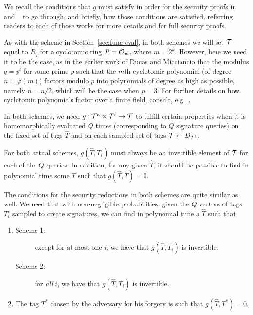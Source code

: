 We recall the conditions that $g$ must satisfy in order for the
security proofs in~\cite{DBLP:conf/pkc/Alperin-Sheriff15} and
~\cite{DBLP:conf/eurocrypt/MicciancioP12} to go through, and briefly,
how those conditions are satisfied, referring readers to each of those
works for more details and for full security proofs.

As with the scheme in Section~\ref{sec:func-eval}, in both schemes we will set $\mathcal{T}$
equal to $R_q$ for a cyclotomic ring $R = \mathcal{O}_{m}$, where
$m=2^{k}$. However, here we need it to be the case, as in the earlier
work of Ducas and Micciancio  that the modulus $q=p^t$ for some prime $p$ such that the
$m$th cyclotomic polynomial (of degree $n=\varphi(m)$) factors modulo $p$ into
polynomials of degree as high as possible, namely $\bar{n}=n/2$, which will be
the case when $p=3$. For further details
on how cyclotomic polynomials factor over a finite field,
consult, e.g.~\cite[Theorem 2.47]{FiniteFieldsIntro}.


In both schemes, we need $g: \mathcal{T}^{\kappa} \times \mathcal{T}^{\ell} \to
\mathcal{T}$ to fulfill certain properties when it is homomorphically evaluated $Q$ times (corresponding to
$Q$ signature queries) on the fixed set of tags $\hat{T}$ and on each
sampled set of tags $\mathcal{T} \gets D_{T^{\ell}}$.

For both actual schemes, $g(\hat{T},T_i)$ must always be an invertible
element of $\mathcal{T}$ for each of the $Q$ queries.
In addition, for any given $\hat{T}$, it should be possible to find in
polynomial time some $\bar{T}$ such that $g(\hat{T},\bar{T})=0$. 

The conditions for the security reductions in both schemes are quite
similar as well. We need that with non-negligible
probabilities, given the $Q$ vectors of tags $T_i$ sampled
to create signatures, we can find in
  polynomial time a $\hat{T}$ such that
\begin{enumerate}
\item \begin{description}
\item[Scheme 1:] except for at most one $i$, we have that
  $g(\hat{T}, T_i)$ is invertible. 
\item[Scheme 2:] for \emph{all} $i$, we have that $g(\hat{T}, T_i)$ is
  invertible.
\end{description}
\item The tag $T^*$ chosen by the adversary for his forgery is such
  that $g(\hat{T}, T^*)=0$.
\end{enumerate}

